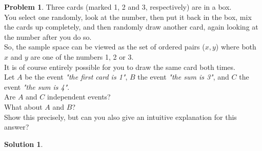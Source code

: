 \documentclass[10pt]{article}
\theoremstyle{plain}
\theoremstyle{definition}
\newtheorem{prob}{Problem}
\newtheorem*{sol}{Solution}
\theoremstyle{remark}
\begin{document}
\begin{prob}
Three cards (marked 1, 2 and 3, respectively) are in a box. \\
You select one randomly, look at the number, then put it back in the box, mix the cards up completely, and then randomly draw another card, again looking at the number after you do so. \\
So, the sample space can be viewed as the set of ordered pairs ($x , y$) where both $x$ and $y$ are one of the numbers 1, 2 or 3. \\
It is of course entirely possible for you to draw the same card both times. \\
Let $A$ be the event \textit{"the first card is 1"}, $B$ the event \textit{"the sum is 3"}, and $C$ the event \textit{"the sum is 4"}. \\
Are $A$ and $C$ independent events? \\
What about $A$ and $B$? \\
Show this precisely, but can you also give an intuitive explanation for this answer? \\
\end{prob}

\medskip

\begin{sol}

\end{sol}
\end{document}
